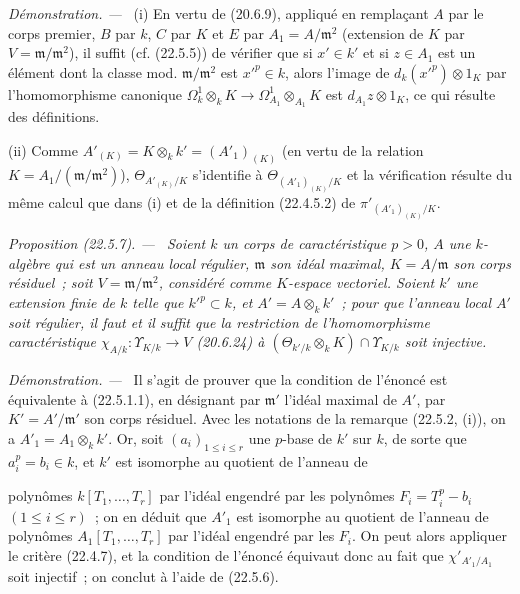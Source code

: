 \documentclass[10pt,oneside]{book}
\makeatletter
\newcommand{\setmanualcurrentlabel}[1]{\def\@currentlabel{#1}}
\newcommand{\oldpage}[2][]{%
  \setcounter{footnote}{0}%
  \marginpar{\scriptsize\textbf{#1}~|~#2}\ignorespaces}
\newenvironment{proposition}[1][]{%
  \setmanualcurrentlabel{#1}\par\medskip\noindent\itshape Proposition (#1). ---\ }{\par}
\newenvironment{proof}{%
  \par\medskip\noindent\textit{Démonstration. ---\ }}{\par}
\makeatother
\begin{document}
\begin{proof}
(i) En vertu de (20.6.9), appliqué en remplaçant $A$ par le corps premier, $B$
par $k$, $C$ par $K$ et $E$ par $A_1=A/\mathfrak m^2$ (extension de $K$ par
$V=\mathfrak m/\mathfrak m^2$), il suffit (cf. (22.5.5)) de vérifier que si
$x'\in k'$ et si $z\in A_1$ est un élément dont la classe mod.
$\mathfrak m/\mathfrak m^2$ est $x'^p\in k$, alors l'image de
$d_k(x'^p)\otimes1_K$ par l'homomorphisme canonique
$\Omega^1_k\otimes_kK\longrightarrow\Omega^1_{A_1}\otimes_{A_1}K$ est
$d_{A_1}z\otimes1_K$, ce qui résulte des définitions.

(ii) Comme $A'_{(K)}=K\otimes_kk'=(A'_1)_{(K)}$ (en vertu de la relation
$K=A_1/(\mathfrak m/\mathfrak m^2)$), $\Theta_{A'_{(K)}/K}$ s'identifie à
$\Theta_{(A'_1)_{(K)}/K}$ et la vérification résulte du même calcul que dans
(i) et de la définition (22.4.5.2) de $\pi'_{(A'_1)_{(K)}/K}$.
\end{proof}

\begin{proposition}[22.5.7]
\label{0.22.5.7-fr}
Soient $k$ un corps de caractéristique $p>0$, $A$ une $k$-algèbre qui est un
anneau local régulier, $\mathfrak m$ son idéal maximal, $K=A/\mathfrak m$ son
corps résiduel~; soit $V=\mathfrak m/\mathfrak m^2$, considéré comme
$K$-espace vectoriel. Soient $k'$ une extension finie de $k$ telle que
$k'^p\subset k$, et $A'=A\otimes_kk'$~; pour que l'anneau local $A'$ soit
régulier, il faut et il suffit que la restriction de l'homomorphisme
caractéristique $\chi_{A/k}:\Upsilon_{K/k}\longrightarrow V$ (20.6.24) à
$(\Theta_{k'/k}\otimes_kK)\cap\Upsilon_{K/k}$ soit injective.
\end{proposition}

\begin{proof}
Il s'agit de prouver que la condition de l'énoncé est équivalente à
(22.5.1.1), en désignant par $\mathfrak m'$ l'idéal maximal de $A'$, par
$K'=A'/\mathfrak m'$ son corps résiduel. Avec les notations de la remarque
(22.5.2, (i)), on a $A'_1=A_1\otimes_kk'$. Or, soit
$(a_i)_{1\leqslant i\leqslant r}$ une $p$-base de $k'$ sur $k$, de sorte que
$a_i^p=b_i\in k$, et $k'$ est isomorphe au quotient de l'anneau de

\oldpage[0\textsubscript{IV-1}]{204}

polynômes $k[T_1,\ldots,T_r]$ par l'idéal engendré par les polynômes
$F_i=T_i^p-b_i$ $(1\leqslant i\leqslant r)$~; on en déduit que $A'_1$ est
isomorphe au quotient de l'anneau de polynômes $A_1[T_1,\ldots,T_r]$ par
l'idéal engendré par les $F_i$. On peut alors appliquer le critère (22.4.7), et
la condition de l'énoncé équivaut donc au fait que $\chi'_{A'_1/A_1}$ soit
injectif~; on conclut à l'aide de (22.5.6).
\end{proof}
\end{document}
